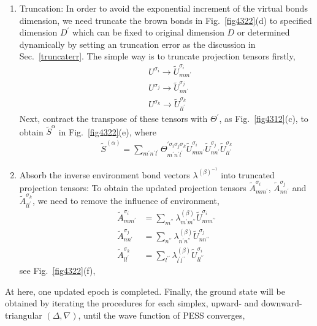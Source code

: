 \begin{enumerate}
	\item Truncation: In order to avoid the exponential increment of the virtual bonds dimension, we need truncate the brown bonds in Fig.~\ref{fig4322}(d) to specified dimension $D^{\prime}$ which can be fixed to original dimension $D$ or determined dynamically by setting an truncation error as the discussion in Sec.~\ref{truncaterr}. The simple way is to truncate projection tensors firstly,  
		\begin{align}
			&U^{\sigma_i} \rightarrow \widetilde{U}^{\sigma_i}_{mm^{\prime}} \\
			&U^{\sigma_j} \rightarrow \widetilde{U}^{\sigma_j}_{nn^{\prime}} \\
			&U^{\sigma_k} \rightarrow \widetilde{U}^{\sigma_k}_{ll^{\prime}}
		\end{align}
		Next, contract the transpose of these tensors with $\Theta^{\prime}$, as Fig.~\ref{fig4312}(c), to obtain $\widetilde{S}^{\alpha}$ in Fig.~\ref{fig4322}(e), where
		\begin{align}
			\widetilde{S}^{(\alpha)} = \sum_{m^{\prime}n^{\prime}l^{\prime}}{\Theta_{m^{\prime} n^{\prime} l^{\prime}}^{\prime \sigma_i \sigma_j \sigma_k} \widetilde{U}^{\sigma_i}_{mm^{\prime}} \widetilde{U}^{\sigma_j}_{nn^{\prime}} \widetilde{U}^{\sigma_k}_{ll^{\prime}}}
		\end{align}
	\item Absorb the inverse environment bond vectors $\lambda^{(\beta)^{-1}}$ into truncated projection tensors: To obtain the updated projection tensors $\widetilde{A}^{\sigma_i}_{mm^{\prime}}$, $\widetilde{A}^{\sigma_j}_{nn^{\prime}}$ and $\widetilde{A}^{\sigma_k}_{ll^{\prime}}$, we need to remove the influence of environment, 
		\begin{align}
			\widetilde{A}^{\sigma_i}_{mm^{\prime}} &= \sum_{m^{\prime \prime}}{ \lambda^{(\beta)}_{m^{\prime} m^{\prime \prime}} \widetilde{U}^{\sigma_i}_{mm^{\prime \prime}}} \\
			\widetilde{A}^{\sigma_j}_{nn^{\prime}} &= \sum_{n^{\prime \prime}}{ \lambda^{(\beta)}_{n^{\prime} n^{\prime \prime}} \widetilde{U}^{\sigma_j}_{nn^{\prime \prime}}} \\
			\widetilde{A}^{\sigma_k}_{ll^{\prime}} &= \sum_{l^{\prime \prime}}{ \lambda^{(\beta)}_{l^{\prime} l^{\prime \prime}} \widetilde{U}^{\sigma_i}_{ll^{\prime \prime}}}
		\end{align}	
		see Fig.~\ref{fig4322}(f),
\end{enumerate}

At here, one updated epoch is completed. Finally, the ground state will be obtained by iterating the procedures for each simplex, upward- and downward- triangular $(\Delta, \nabla)$, until the wave function of PESS converges, 
